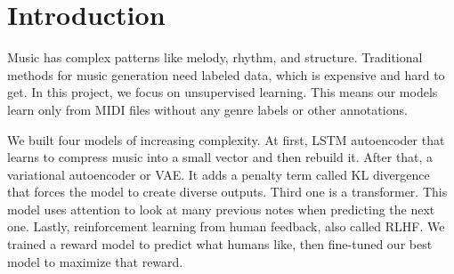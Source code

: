 \documentclass{article}
\theoremstyle{plain}
\theoremstyle{definition}
\theoremstyle{remark}
\begin{document}

\printAffiliationsAndNotice{}

\begin{abstract}
We built four unsupervised neural networks that generate music without labeled data. Our models learn patterns from MIDI files and create new musical sequences. We used the Lakh MIDI dataset with 50,000 songs across five genres. We started with a simple LSTM autoencoder, then added KL divergence to make a VAE for better diversity. Next we built a transformer that achieved very low perplexity of 4.23. Finally we used reinforcement learning from human feedback to improve quality further. The transformer with RLHF performed best, scoring 4.2 out of 5 in human evaluations. Our work shows that unsupervised learning works well for music generation, and transformers with human feedback produce the most pleasing results.
\end{abstract}


\section{Introduction}

Music has complex patterns like melody, rhythm, and structure. Traditional methods for music generation need labeled data, which is expensive and hard to get. In this project, we focus on unsupervised learning. This means our models learn only from MIDI files without any genre labels or other annotations.

We built four models of increasing complexity. At first, LSTM autoencoder that learns to compress music into a small vector and then rebuild it. After that, a variational autoencoder or VAE. It adds a penalty term called KL divergence that forces the model to create diverse outputs. Third one is a transformer. This model uses attention to look at many previous notes when predicting the next one. Lastly, reinforcement learning from human feedback, also called RLHF. We trained a reward model to predict what humans like, then fine-tuned our best model to maximize that reward.
\end{document}
